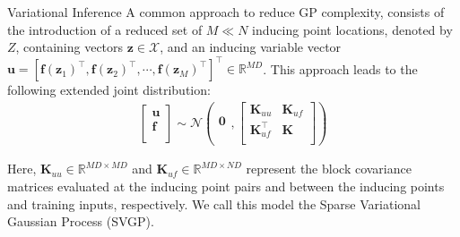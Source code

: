 \begin{frame}{Variational Inference}
	A common approach to reduce GP complexity, consists of the introduction of a reduced set of $M \ll N$ inducing point locations, denoted by $Z$, containing vectors $\mathbf{z} \in \mathcal{X}$, and an inducing variable vector $\mathbf{u} = [\bm{f}(\bm{z}_1)^\top, \bm{f}(\bm{z}_2)^\top, \cdots, \bm{f}(\bm{z}_{M})^\top]^\top \in \mathbb{R}^{M D}$. This approach leads to the following extended joint distribution:
	\begin{equation}
	\begin{array}{rcl}
	\left[ \begin{array}{c}
	\mathbf{u}\\
	\mathbf{f}\\
	\end{array}
	\right]
	\sim
	\mathcal{N} \left(
	\begin{array}{c}
	\mathbf{0}\\
	\end{array},
	\left[ \begin{array}{cc}
	\mathbf{K}_{uu} & \mathbf{K}_{uf}\\
	\mathbf{K}_{uf}^\top & \mathbf{K}\\
	\end{array}
	\right] \right)
	\end{array}
	\end{equation}
	
	Here, $\mathbf{K}_{uu} \in \mathbb{R}^{MD \times MD}$ and $\mathbf{K}_{uf} \in \mathbb{R}^{MD \times ND}$ represent the block covariance matrices evaluated at the inducing point pairs and between the inducing points and training inputs, respectively. We call this model the Sparse Variational Gaussian Process (SVGP). 
	
\end{frame}

